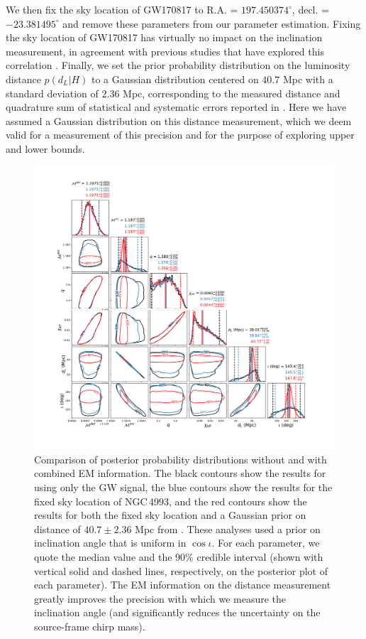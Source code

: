 We then fix the sky location of GW170817 to R.A. = $197.450374^\circ$, decl. = $-23.381495^\circ$ \cite{Soares-Santos:2017lru} and remove these parameters from our parameter estimation.  Fixing the sky location of GW170817 has virtually no impact on the inclination measurement, in agreement with previous studies that have explored this correlation \cite{Seto:2005xb,Arun:2014ysa}. Finally, we set the prior probability distribution on the luminosity distance $p(d_L|H)$ to a Gaussian distribution centered on $40.7$ Mpc with a standard deviation of $2.36$ Mpc, corresponding to the measured distance and quadrature sum of statistical and systematic errors reported in \cite{Cantiello:2018ffy}. Here we have assumed a Gaussian distribution on this distance measurement, which we deem valid for a measurement of this precision and for the purpose of exploring upper and lower bounds.

\begin{figure}[ht]
\includegraphics[width=\textwidth]{Figures/inc-angle/GW_vs_EM_pmspins_full_final.pdf}
\caption{Comparison of posterior probability distributions without and with combined EM information. The black contours show the results for using only the GW signal, the blue contours show the results for the fixed sky location of NGC\,4993, and the red contours show the results for both the fixed sky location and a Gaussian prior on distance of $40.7\pm 2.36$ Mpc from \cite{Cantiello:2018ffy}. These analyses used a prior on inclination angle that is uniform in $\cos \iota$. For each parameter, we quote the median value and the 90\% credible interval (shown with vertical solid and dashed lines, respectively, on the posterior plot of each parameter). The EM information on the distance measurement greatly improves the precision with which we measure the inclination angle (and significantly reduces the uncertainty on the source-frame chirp mass).}
\label{fig:posteriors}
\end{figure}

